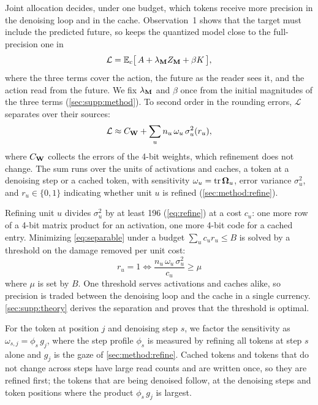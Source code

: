 Joint allocation decides, under one budget, which tokens receive more precision in the denoising loop and in the cache.
Observation~1 shows that the target must include the predicted future, so \method keeps the quantized model close to the full-precision one in
\begin{equation}
  \mathcal{L} = \mathbb{E}_c\big[\,A + \lambda_{\mathbf{M}} Z_{\mathbf{M}} + \beta K\,\big],
  \label{eq:objective}
\end{equation}
where the three terms cover the action, the future as the reader sees it, and the action read from the future.
We fix $\lambda_{\mathbf{M}}$ and $\beta$ once from the initial magnitudes of the three terms (\cref{sec:supp:method}).
To second order in the rounding errors, $\mathcal{L}$ separates over their sources:
\begin{equation}
  \mathcal{L} \approx C_{\mathbf{W}} + \sum_{u} n_u\, \omega_u\, \sigma_u^2(r_u),
  \label{eq:separable}
\end{equation}
where $C_{\mathbf{W}}$ collects the errors of the 4-bit weights, which refinement does not change.
The sum runs over the units of activations and caches, a token at a denoising step or a cached token, with sensitivity $\omega_u = \operatorname{tr}\boldsymbol{\Omega}_u$, error variance $\sigma_u^2$, and $r_u \in \{0, 1\}$ indicating whether unit $u$ is refined (\cref{sec:method:refine}).

Refining unit $u$ divides $\sigma_u^2$ by at least 196 (\cref{eq:refine}) at a cost $c_u$: one more row of a 4-bit matrix product for an activation, one more 4-bit code for a cached entry.
Minimizing \cref{eq:separable} under a budget $\sum_u c_u r_u \le B$ is solved by a threshold on the damage removed per unit cost:
\begin{equation}
  r_u = 1 \iff \frac{n_u\, \omega_u\, \sigma_u^2}{c_u} \ge \mu
  \label{eq:threshold}
\end{equation}
where $\mu$ is set by $B$.
One threshold serves activations and caches alike, so precision is traded between the denoising loop and the cache in a single currency.
\cref{sec:supp:theory} derives the separation and proves that the threshold is optimal.

For the token at position $j$ and denoising step $s$, we factor the sensitivity as $\omega_{s,j} = \phi_s\, g_j$, where the step profile $\phi_s$ is measured by refining all tokens at step $s$ alone and $g_j$ is the gaze of \cref{sec:method:refine}.
Cached tokens and tokens that do not change across steps have large read counts and are written once, so they are refined first; the tokens that are being denoised follow, at the denoising steps and token positions where the product $\phi_s\, g_j$ is largest.

